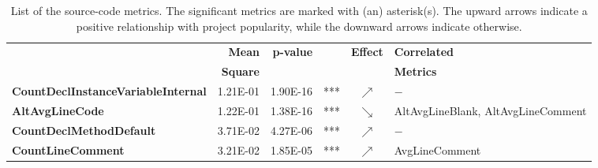 \begin{table*}[t]
\centering
\caption{List of the source-code metrics. The significant metrics are marked with (an) asterisk(s). The upward arrows indicate a positive relationship with project popularity, while the downward arrows indicate otherwise.}
\label{table:RQ3}
\begin{tabular}{|>{\bfseries}l|r|rl|c|l|}
	\hline
	\multirow{2}{*}{Metric} & \textbf{Mean}  & \multirow{2}{*}{\textbf{p-value}}  &     & \multirow{2}{*}{\textbf{Effect}}     &\textbf{Correlated}\\
	&\textbf{Square}&& &&\textbf{Metrics} \\
	\hline	\hline
CountDeclInstanceVariableInternal          & 1.21E-01 & 1.90E-16 & *** & $\nearrow$ &             $-$                                                                                                                                                                                                                                                                                                                                                     \\
AltAvgLineCode                             & 1.22E-01 & 1.38E-16 & *** & $\searrow$ & AltAvgLineBlank, AltAvgLineComment                                                                                                                                                                                                                                                                                                                              \\
CountDeclMethodDefault                     & 3.71E-02 & 4.27E-06 & *** & $\nearrow$ &               $-$                                                                                                                                                                                                                                                                                                                                                   \\
CountLineComment                           & 3.21E-02 & 1.85E-05 & *** & $\nearrow$ & AvgLineComment                                                                                                                                                                                                                                                                                                                                                  \\

\end{tabular}
\end{table*}
